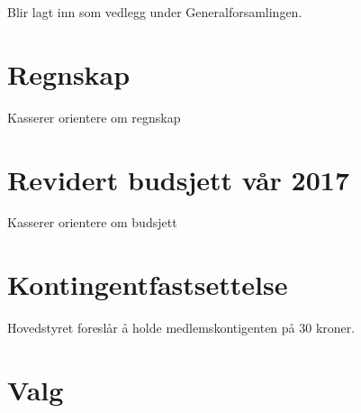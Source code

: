 \documentclass[10pt,norsk,a4paper]{article}
\begin{document}
Blir lagt inn som vedlegg under Generalforsamlingen.

\newpage

\section{Regnskap}
Kasserer orientere om regnskap\\



\section{Revidert budsjett vår 2017}
Kasserer orientere om budsjett\\


\newpage

\section{Kontingentfastsettelse}
Hovedstyret foreslår å holde medlemskontigenten på 30 kroner.\\

\section{Valg}
\end{document}
